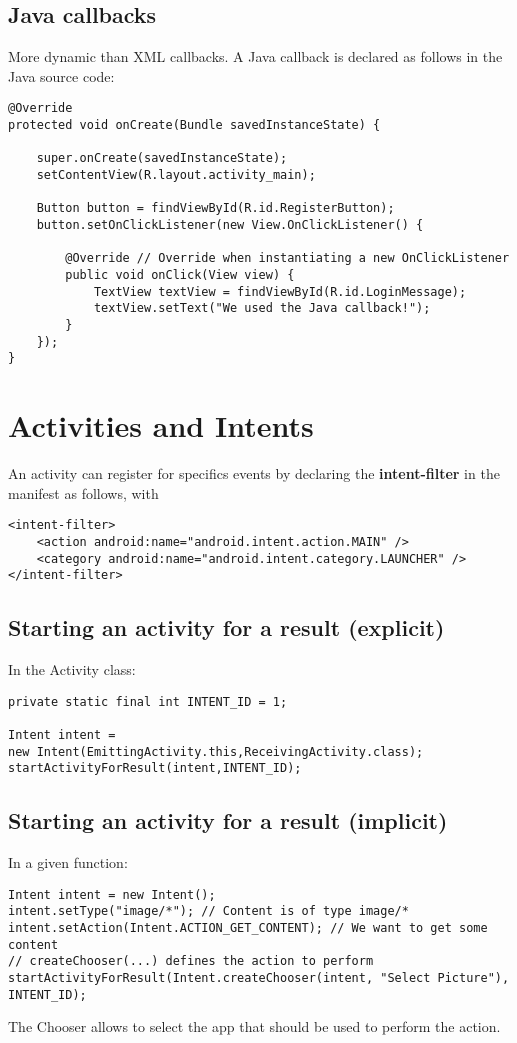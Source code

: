 \documentclass[11pt]{article}
\begin{document}
\subsection{Java callbacks}
More dynamic than XML callbacks. A Java callback is declared as follows in the Java source code:
\lstset{language = Java}
\begin{lstlisting}
@Override
protected void onCreate(Bundle savedInstanceState) {

    super.onCreate(savedInstanceState);
    setContentView(R.layout.activity_main);
    
    Button button = findViewById(R.id.RegisterButton);
    button.setOnClickListener(new View.OnClickListener() {
        
        @Override // Override when instantiating a new OnClickListener
        public void onClick(View view) {
            TextView textView = findViewById(R.id.LoginMessage);
            textView.setText("We used the Java callback!");
        }
    });
}
\end{lstlisting}


\section{Activities and Intents}
An activity can register for specifics events by declaring the \textbf{intent-filter} in the manifest as follows, with 
\lstset{language = XML}
\begin{lstlisting}
<intent-filter>
    <action android:name="android.intent.action.MAIN" />
    <category android:name="android.intent.category.LAUNCHER" />
</intent-filter>
\end{lstlisting}

\subsection{Starting an activity for a result (explicit)}
In the Activity class:
\lstset{language = Java}
\begin{lstlisting}
private static final int INTENT_ID = 1;

Intent intent = 
new Intent(EmittingActivity.this,ReceivingActivity.class);
startActivityForResult(intent,INTENT_ID);
\end{lstlisting}

\subsection{Starting an activity for a result (implicit)}
In a given function: 
\lstset{language = Java}
\begin{lstlisting}
Intent intent = new Intent();
intent.setType("image/*"); // Content is of type image/* 
intent.setAction(Intent.ACTION_GET_CONTENT); // We want to get some content
// createChooser(...) defines the action to perform
startActivityForResult(Intent.createChooser(intent, "Select Picture"), INTENT_ID);
\end{lstlisting}
The Chooser allows to select the app that should be used to perform the action. 
\end{document}
